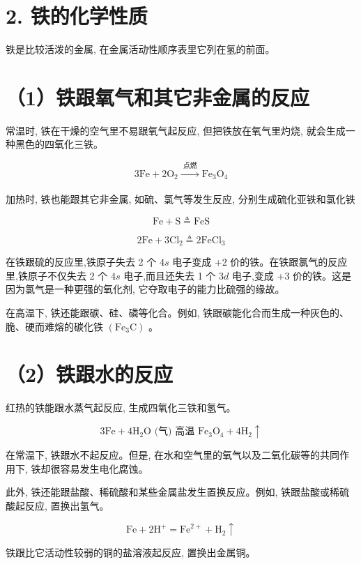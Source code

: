 \documentclass[10pt]{article}
\begin{document}
\section*{2. 铁的化学性质}

铁是比较活泼的金属, 在金属活动性顺序表里它列在氢的前面。

\section*{（1）铁跟氧气和其它非金属的反应}

常温时, 铁在干燥的空气里不易跟氧气起反应, 但把铁放在氧气里灼烧, 就会生成一种黑色的四氧化三铁。

\[
3\mathrm{{Fe}} + 2{\mathrm{O}}_{2}\xrightarrow[]{\text{ 点燃 }}{\mathrm{{Fe}}}_{3}{\mathrm{O}}_{4}
\]

加热时, 铁也能跟其它非金属, 如硫、氯气等发生反应, 分别生成硫化亚铁和氯化铁

\[
\mathrm{{Fe}} + \mathrm{S} \triangleq \mathrm{{FeS}}
\]

\[
2\mathrm{{Fe}} + 3{\mathrm{{Cl}}}_{2} \triangleq 2{\mathrm{{FeCl}}}_{3}
\]

在铁跟硫的反应里,铁原子失去 2 个 \({4s}\) 电子变成 +2 价的铁。在铁跟氯气的反应里,铁原子不仅失去 2 个 \({4s}\) 电子,而且还失去 1 个 \({3d}\) 电子,变成 +3 价的铁。这是因为氯气是一种更强的氧化剂, 它夺取电子的能力比硫强的缘故。

在高温下, 铁还能跟碳、硅、磷等化合。例如, 铁跟碳能化合而生成一种灰色的、脆、硬而难熔的碳化铁 \(\left( {{\mathrm{{Fe}}}_{3}\mathrm{C}}\right)\) 。

\section*{（2）铁跟水的反应}

红热的铁能跟水蒸气起反应, 生成四氧化三铁和氢气。

\[
3\mathrm{{Fe}} + 4{\mathrm{H}}_{2}\mathrm{O}\text{ (气) 高温 }{\mathrm{{Fe}}}_{3}{\mathrm{O}}_{4} + 4{\mathrm{H}}_{2} \uparrow
\]

在常温下, 铁跟水不起反应。但是, 在水和空气里的氧气以及二氧化碳等的共同作用下, 铁却很容易发生电化腐蚀。

此外, 铁还能跟盐酸、稀硫酸和某些金属盐发生置换反应。例如, 铁跟盐酸或稀硫酸起反应, 置换出氢气。

\[
\mathrm{{Fe}} + 2{\mathrm{H}}^{ + } = {\mathrm{{Fe}}}^{2 + } + {\mathrm{H}}_{2} \uparrow
\]

铁跟比它活动性较弱的铜的盐溶液起反应, 置换出金属铜。
\end{document}
